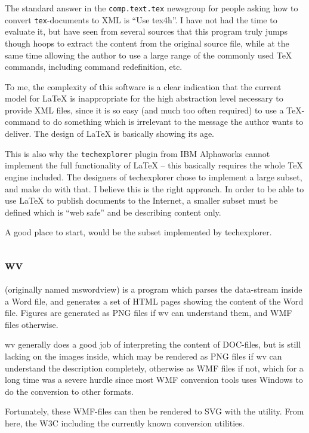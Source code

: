 The standard answer in the \texttt{comp.text.tex} newsgroup for people
asking how to convert \texttt{tex}-documents to XML is ``Use tex4h''.
I have not had the time to evaluate it, but have seen from several
sources that this program truly jumps though hoops to extract the
content from the original source file, while at the same time allowing
the author to use a large range of the commonly used {\TeX} commands,
including command redefinition, etc.  

To me, the complexity of this software is a clear indication that the
current model for {\LaTeX} is inappropriate for the high abstraction
level necessary to provide XML files, since it is so easy (and much
too often required) to use a \TeX-command to do something which is
irrelevant to the message the author wants to deliver.   The design of
{\LaTeX} is basically showing its age.

This is also why the \texttt{techexplorer} plugin from IBM Alphaworks
cannot implement the full functionality of {\LaTeX} -- this basically
requires the whole {\TeX} engine included.  The designers of
techexplorer chose to implement a large subset, and make do with
that.  I believe this is the right approach.  In order to be able to
use {\LaTeX} to publish documents to the Internet, a smaller subset
must be defined which is ``web safe'' and be describing content only.

A good place to start, would be the subset implemented by techexplorer.

\subsection{wv}

 (originally named mswordview) is a
program which parses the data-stream inside a Word file, and generates
a set of HTML pages showing the content of the Word file.  Figures are
generated as PNG files if wv can understand them, and WMF files
otherwise.

wv generally does a good job of interpreting the content of DOC-files,
but is still lacking on the images inside, which may be rendered as
PNG files if wv can understand the description completely, otherwise
as WMF files if not, which for a long time was a severe hurdle since
most WMF conversion tools uses Windows to do the conversion to other
formats.

Fortunately,  these WMF-files can then be rendered to SVG with the
utility.  From here, the W3C
 including the currently known conversion utilities.


